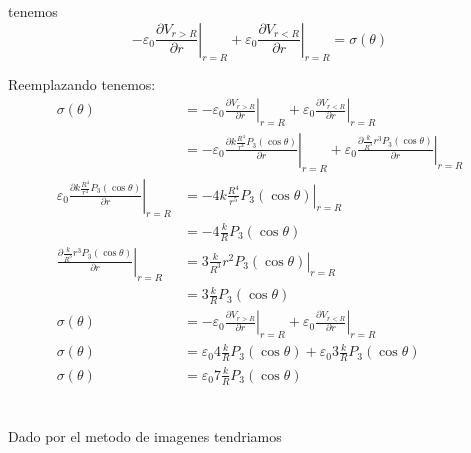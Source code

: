 \documentclass{report}
\begin{document}
tenemos
\[
	-\varepsilon_0 \left.\frac{\partial V_{r > R}}{\partial r}\right|_{r=R} + \varepsilon_0 \left.\frac{\partial V_{r < R}}{\partial r}\right|_{r=R} = \sigma(\theta)
\]

Reemplazando tenemos:
\begin{align*}
	\sigma(\theta) &= -\varepsilon_0 \left.\frac{\partial V_{r > R}}{\partial r}\right|_{r=R} + \varepsilon_0 \left.\frac{\partial V_{r < R}}{\partial r}\right|_{r=R}\\
	&= -\varepsilon_0 \left.\frac{\partial k\frac{R^4}{r^4}P_3(\cos\theta)}{\partial r}\right|_{r=R} + \varepsilon_0 \left.\frac{\partial \frac{k}{R^3}r^3 P_3(\cos\theta)}{\partial r}\right|_{r=R} \\
	\varepsilon_0 \left.\frac{\partial k\frac{R^4}{r^4}P_3(\cos\theta)}{\partial r}\right|_{r=R} &= - \left.4 k \frac{R^4}{r^5} P_3(\cos\theta)\right|_{r = R}\\
	&= -4\frac{k}{R}P_3(\cos\theta)\\
	\left.\frac{\partial \frac{k}{R^3}r^3 P_3(\cos\theta)}{\partial r}\right|_{r=R} &= \left. 3\frac{k}{R^3}r^2 P_3(\cos\theta) \right|_{r=R}\\
	&= 3 \frac{k}{R}P_3(\cos\theta)\\
	\sigma(\theta) &= -\varepsilon_0 \left.\frac{\partial V_{r > R}}{\partial r}\right|_{r=R} + \varepsilon_0 \left.\frac{\partial V_{r < R}}{\partial r}\right|_{r=R}\\
	\sigma(\theta) &= \varepsilon_0 4\frac{k}{R}P_3(\cos\theta) + \varepsilon_0 3 \frac{k}{R}P_3(\cos\theta)\\
	\sigma(\theta) &= \varepsilon_0 7\frac{k}{R}P_3(\cos\theta)
\end{align*}

\chapter{}

\section{}

Dado por el metodo de imagenes tendriamos
\end{document}
